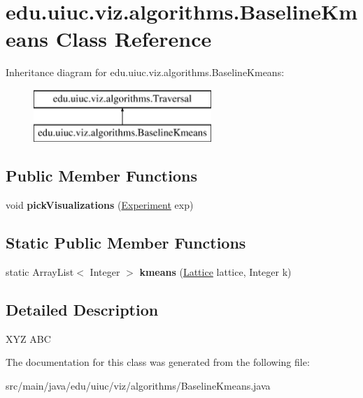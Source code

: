 \hypertarget{classedu_1_1uiuc_1_1viz_1_1algorithms_1_1_baseline_kmeans}{}\section{edu.\+uiuc.\+viz.\+algorithms.\+Baseline\+Kmeans Class Reference}
\label{classedu_1_1uiuc_1_1viz_1_1algorithms_1_1_baseline_kmeans}
Inheritance diagram for edu.\+uiuc.\+viz.\+algorithms.\+Baseline\+Kmeans\+:\begin{figure}[H]
\begin{center}
\leavevmode
\includegraphics[height=2.000000cm]{classedu_1_1uiuc_1_1viz_1_1algorithms_1_1_baseline_kmeans}
\end{center}
\end{figure}
\subsection*{Public Member Functions}
\begin{DoxyCompactItemize}
\item 
\mbox{\label{classedu_1_1uiuc_1_1viz_1_1algorithms_1_1_baseline_kmeans_a2e044260989a13c076ca43ad6d5892f6}} 
void {\bfseries pick\+Visualizations} (\mbox{\hyperlink{classedu_1_1uiuc_1_1viz_1_1algorithms_1_1_experiment}{Experiment}} exp)
\end{DoxyCompactItemize}
\subsection*{Static Public Member Functions}
\begin{DoxyCompactItemize}
\item 
\mbox{\label{classedu_1_1uiuc_1_1viz_1_1algorithms_1_1_baseline_kmeans_a6e19514a9da74ae0f3b43bc9a91c23e8}} 
static Array\+List$<$ Integer $>$ {\bfseries kmeans} (\mbox{\hyperlink{classedu_1_1uiuc_1_1viz_1_1lattice_1_1_lattice}{Lattice}} lattice, Integer k)
\end{DoxyCompactItemize}


\subsection{Detailed Description}
X\+YZ A\+BC 

The documentation for this class was generated from the following file\+:\begin{DoxyCompactItemize}
\item 
src/main/java/edu/uiuc/viz/algorithms/Baseline\+Kmeans.\+java\end{DoxyCompactItemize}
